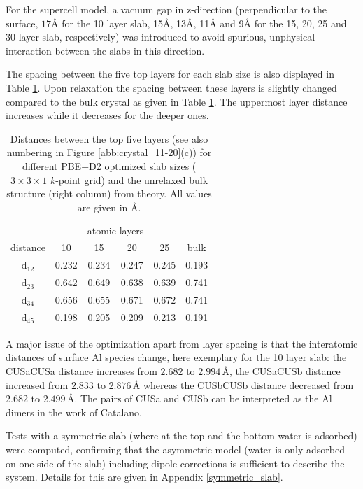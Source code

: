 \documentclass[11pt,DIV=13,BCOR=5mm,a4paper,headinclude]{scrbook}
\renewcommand{\vec}[1]{\underline{#1}}
\begin{document}
For the supercell model, a vacuum gap in z-direction (perpendicular to the surface, $17$\AA{} for the 10 layer slab, 15\AA{}, 13\AA{}, 11\AA{} and 9\AA{} for the 15, 20, 25 and 30 layer slab, respectively) was introduced to avoid spurious, unphysical interaction between the slabs in this direction.

The spacing between the five top layers for each slab size is also displayed in Table \ref{tab:layer-dist}.
Upon relaxation the spacing between these layers is slightly changed compared to the bulk crystal as given in Table \ref{tab:layer-dist}.
The uppermost layer distance increases while it decreases for the deeper ones.
\begin{table}[!ht]
  \centering
 \caption{Distances between the top five layers (see also numbering in Figure \ref{abb:crystal_11-20}(c)) for different PBE+D2 optimized slab sizes ($3\times 3\times 1$ $\vec{k}$-point grid) and the unrelaxed bulk structure (right column) from theory.
All values are given in \AA.} 
\vspace*{.2cm}
\begin{tabular}{c|cccc|c}
\toprule
 & &\multicolumn{2}{c}{atomic layers}&&\\
    distance    & 10   & 15   & 20   & 25   &bulk \\\midrule
 d$_{12}$	&0.232 &0.234 &0.247 &0.245 &0.193 \\
 d$_{23}$	&0.642 &0.649 &0.638 &0.639 &0.741 \\
 d$_{34}$	&0.656 &0.655 &0.671 &0.672 &0.741 \\
 d$_{45}$	&0.198 &0.205 &0.209 &0.213 &0.191 \\\bottomrule
  \end{tabular}
  \label{tab:layer-dist}
\end{table}
A major issue of the optimization apart from layer spacing is that the interatomic distances of surface Al species change, here exemplary for the 10 layer slab: the CUSa\textendash CUSa distance increases from $2.682$ to $2.994\,$\AA{}, the CUSa\textendash CUSb distance increased from $2.833$ to $2.876\,$\AA{} whereas the CUSb\textendash CUSb distance decreased from $2.682$ to $2.499\,$\AA{}.
The pairs of CUSa and CUSb can be interpreted as the Al dimers in the work of Catalano\cite{catalano}.



Tests with a symmetric slab (where at the top and the bottom water is adsorbed) were computed, confirming that the asymmetric model (water is only adsorbed on one side of the slab) including dipole corrections is sufficient to describe the system.
Details for this are given in Appendix \ref{symmetric_slab}.
\end{document}
